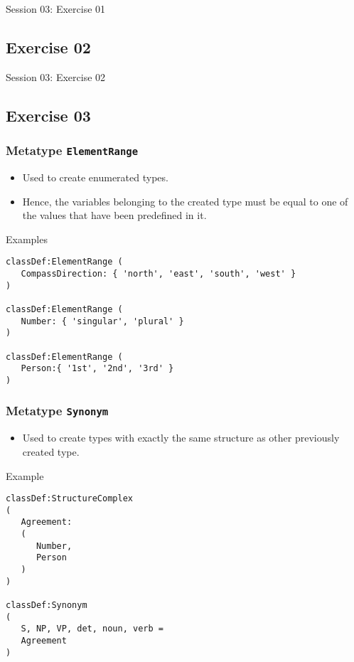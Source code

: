 \documentclass[11pt]{beamer}
\begin{document}
\begin{frame}[fragile]
\Huge
\begin{center}
Session 03: Exercise 01
\end{center}
\end{frame}

\subsection{Exercise 02}

\begin{frame}[fragile]
\Huge
\begin{center}
Session 03: Exercise 02
\end{center}
\end{frame}

\subsection{Exercise 03}

\begin{frame}[fragile]
\frametitle{Metatype \texttt{ElementRange}}
\begin{itemize}
	\item Used to create enumerated types.
	\pause
	\item Hence, the variables belonging to the created type must be equal to one of the values that have been predefined in it.
\end{itemize}
\pause
{}
\begin{block}{Examples}
\scriptsize
\begin{lstlisting}[language=lekta]
classDef:ElementRange (
   CompassDirection: { 'north', 'east', 'south', 'west' }
)

classDef:ElementRange (
   Number: { 'singular', 'plural' }
)

classDef:ElementRange (
   Person:{ '1st', '2nd', '3rd' }
)
\end{lstlisting}
\end{block}
\end{frame}

\begin{frame}[fragile]
\frametitle{Metatype \texttt{Synonym}}
\begin{itemize}
	\item Used to create types with exactly the same structure as other previously created type.
\end{itemize}
\pause
{}
\begin{block}{Example}
\scriptsize
\begin{lstlisting}[language=lekta]
classDef:StructureComplex 
(
   Agreement: 
   (
      Number,
      Person
   )
)

classDef:Synonym 
(
   S, NP, VP, det, noun, verb = 
   Agreement 
)
\end{lstlisting}
\end{block}
\end{frame}
\end{document}
